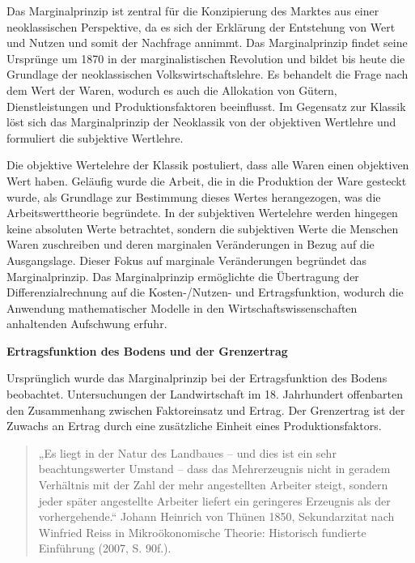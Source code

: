 \documentclass[
  nswissgerman,
  a4paper,
  DIV=11,
  numbers=noendperiod,
  oneside,
  openany]{scrreprt}
\begin{document}
\begin{tcolorbox}[enhanced jigsaw, arc=.35mm, bottomrule=.15mm, bottomtitle=1mm, breakable, colback=white, colbacktitle=quarto-callout-tip-color!10!white, colframe=quarto-callout-tip-color-frame, coltitle=black, left=2mm, leftrule=.75mm, opacityback=0, opacitybacktitle=0.6, rightrule=.15mm, title={Exkurs: Das Marginalprinzip -- Grenznutzen und Grenzkosten}, titlerule=0mm, toprule=.15mm, toptitle=1mm]

Das Marginalprinzip ist zentral für die Konzipierung des Marktes aus
einer neoklassischen Perspektive, da es sich der Erklärung der
Entstehung von Wert und Nutzen und somit der Nachfrage annimmt. Das
Marginalprinzip findet seine Ursprünge um 1870 in der marginalistischen
Revolution und bildet bis heute die Grundlage der neoklassischen
Volkswirtschaftslehre. Es behandelt die Frage nach dem Wert der Waren,
wodurch es auch die Allokation von Gütern, Dienstleistungen und
Produktionsfaktoren beeinflusst. Im Gegensatz zur Klassik löst sich das
Marginalprinzip der Neoklassik von der objektiven Wertlehre und
formuliert die subjektive Wertlehre.

Die objektive Wertelehre der Klassik postuliert, dass alle Waren einen
objektiven Wert haben. Geläufig wurde die Arbeit, die in die Produktion
der Ware gesteckt wurde, als Grundlage zur Bestimmung dieses Wertes
herangezogen, was die Arbeitswerttheorie begründete. In der subjektiven
Wertelehre werden hingegen keine absoluten Werte betrachtet, sondern die
subjektiven Werte die Menschen Waren zuschreiben und deren marginalen
Veränderungen in Bezug auf die Ausgangslage. Dieser Fokus auf marginale
Veränderungen begründet das Marginalprinzip. Das Marginalprinzip
ermöglichte die Übertragung der Differenzialrechnung auf die
Kosten-/Nutzen- und Ertragsfunktion, wodurch die Anwendung
mathematischer Modelle in den Wirtschaftswissenschaften anhaltenden
Aufschwung erfuhr.

\textbf{Ertragsfunktion des Bodens und der Grenzertrag}

Ursprünglich wurde das Marginalprinzip bei der Ertragsfunktion des
Bodens beobachtet. Untersuchungen der Landwirtschaft im 18. Jahrhundert
offenbarten den Zusammenhang zwischen Faktoreinsatz und Ertrag. Der
Grenzertrag ist der Zuwachs an Ertrag durch eine zusätzliche Einheit
eines Produktionsfaktors.

\begin{quote}
„Es liegt in der Natur des Landbaues -- und dies ist ein sehr
beachtungswerter Umstand -- dass das Mehrerzeugnis nicht in geradem
Verhältnis mit der Zahl der mehr angestellten Arbeiter steigt, sondern
jeder später angestellte Arbeiter liefert ein geringeres Erzeugnis als
der vorhergehende.`` Johann Heinrich von Thünen 1850, Sekundarzitat nach
Winfried Reiss in Mikroökonomische Theorie: Historisch fundierte
Einführung (2007, S. 90f.).
\end{quote}


\end{tcolorbox}
\end{document}
